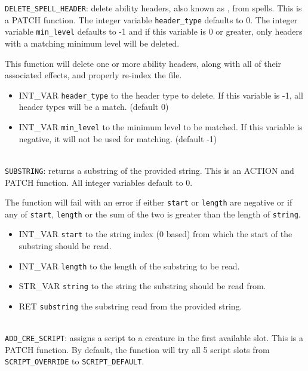 \documentclass{article}
\begin{document}
\verb+DELETE_SPELL_HEADER+: delete ability headers, also known as , from spells. This is a PATCH function. The integer variable \verb+header_type+ defaults to 0. The integer variable \verb+min_level+ defaults to -1 and if this variable is 0 or greater, only headers with a matching minimum level will be deleted.

This function will delete one or more ability headers, along with all of their associated effects, and properly re-index the file.

\begin{itemize}
\item INT_VAR \verb+header_type+ to the header type to delete. If this variable is -1, all header types will be a match. (default 0)
\item INT_VAR \verb+min_level+ to the minimum level to be matched. If this variable is negative, it will not be used for matching. (default -1)
\end{itemize}
\\

\verb+SUBSTRING+: returns a substring of the provided string. This is an ACTION and PATCH function. All integer variables default to 0.

The function will fail with an error if either \verb+start+ or \verb+length+ are negative or if any of \verb+start+, \verb+length+ or the sum of the two is greater than the length of \verb+string+.
\begin{itemize}
\item INT_VAR \verb+start+ to the string index (0 based) from which the start of the substring should be read.
\item INT_VAR \verb+length+ to the length of the substring to be read.
\item STR_VAR \verb+string+ to the string the substring should be read from.
\item RET \verb+substring+ the substring read from the provided string.
\end{itemize}
\\

\verb+ADD_CRE_SCRIPT+: assigns a script to a creature in the first available slot. This is a PATCH function. By default, the function will try all 5 script slots from \verb+SCRIPT_OVERRIDE+ to \verb+SCRIPT_DEFAULT+.
\end{document}
